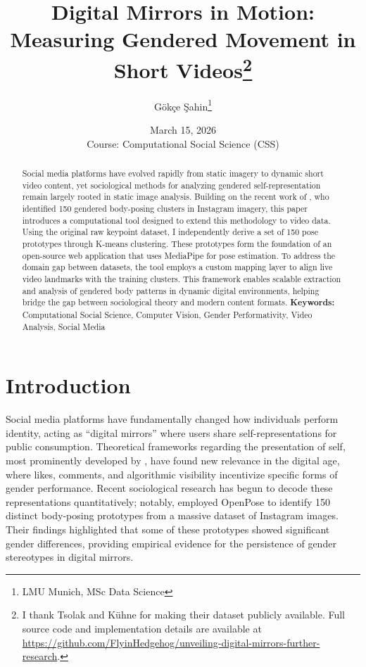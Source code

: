 \documentclass[12pt, a4paper]{article}
\title{\textbf{Digital Mirrors in Motion: Measuring Gendered Movement in Short Videos}\thanks{I thank Tsolak and K\"uhne for making their dataset publicly available. Full source code and implementation details are available at \url{https://github.com/FlyinHedgehog/unveiling-digital-mirrors-further-research}.}}
\author{G\"ok\c{c}e \c{S}ahin\thanks{LMU Munich, MSc Data Science}}
\date{March 15, 2026\\[0.5em]Course: Computational Social Science (CSS)}
\begin{document}
\maketitle

\begin{abstract}
Social media platforms have evolved rapidly from static imagery to dynamic short video content, yet sociological methods for analyzing gendered self-representation remain largely rooted in static image analysis. Building on the recent work of \citet{tsolak2025unveiling}, who identified 150 gendered body-posing clusters in Instagram imagery, this paper introduces a computational tool designed to extend this methodology to video data. Using the original raw keypoint dataset, I independently derive a set of 150 pose prototypes through K-means clustering. These prototypes form the foundation of an open-source web application \citep{sahin2026unveiling} that uses MediaPipe for pose estimation. To address the domain gap between datasets, the tool employs a custom mapping layer to align live video landmarks with the training clusters. This framework enables scalable extraction and analysis of gendered body patterns in dynamic digital environments, helping bridge the gap between sociological theory and modern content formats.
\medskip
\noindent\textbf{Keywords:} Computational Social Science, Computer Vision, Gender Performativity, Video Analysis, Social Media
\end{abstract}

\newpage
\tableofcontents
\newpage

\section{Introduction}
\label{sec:intro}

Social media platforms have fundamentally changed how individuals perform identity, acting as ``digital mirrors'' where users share self-representations for public consumption. Theoretical frameworks regarding the presentation of self, most prominently developed by \citet{goffman1979gender}, have found new relevance in the digital age, where likes, comments, and algorithmic visibility incentivize specific forms of gender performance. Recent sociological research has begun to decode these representations quantitatively; notably, \citet{tsolak2025unveiling} employed OpenPose \citep{openpose2019} to identify 150 distinct body-posing prototypes from a massive dataset of Instagram images. Their findings highlighted that some of these prototypes showed significant gender differences, providing empirical evidence for the persistence of gender stereotypes in digital mirrors.
\end{document}
